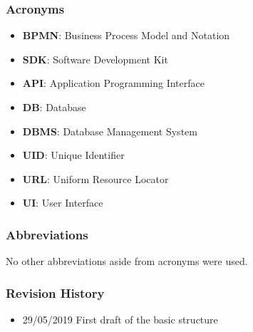 \subsubsection{Acronyms}
\begin{itemize}
\item \textbf{BPMN}: Business Process Model and Notation
\item \textbf{SDK}: Software Development Kit
\item \textbf{API}: Application Programming Interface
\item \textbf{DB}: Database
\item \textbf{DBMS}: Database Management System
\item \textbf{UID}: Unique Identifier
\item \textbf{URL}: Uniform Resource Locator
\item \textbf{UI}: User Interface
\end{itemize}
\subsubsection{Abbreviations}
No other abbreviations aside from acronyms were used.
\subsubsection{Revision History}
\begin{itemize}
\item 29/05/2019 First draft of the basic structure
\end{itemize}
